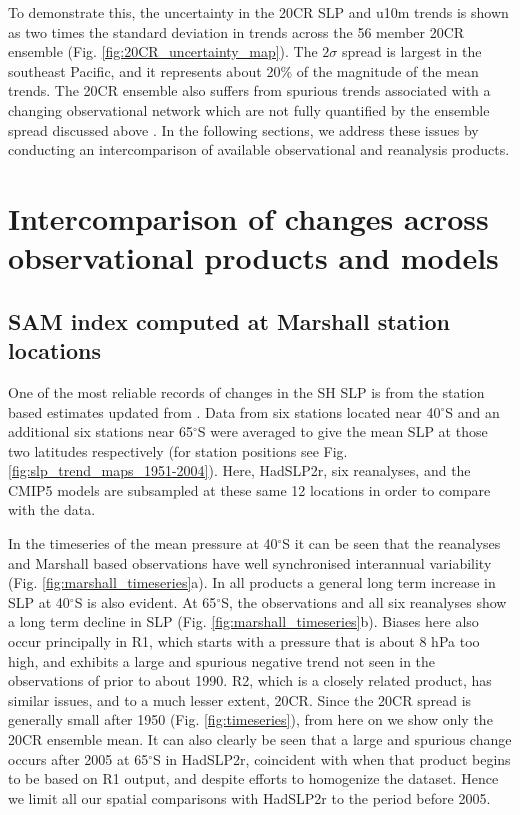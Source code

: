 \documentclass{ametsoc}
\begin{document}
To demonstrate this, the uncertainty in the 
20CR SLP and u10m trends is shown as two times the standard deviation in trends across the 56 member 
20CR ensemble (Fig. \ref{fig:20CR_uncertainty_map}). The $2 \sigma$ spread is largest in the southeast
Pacific, and it represents about 20\% of the magnitude of the mean trends. The 20CR ensemble also suffers 
from spurious trends associated with a changing observational network which are not fully quantified by 
the ensemble spread discussed above \citep{Wang_et_al_2013}. In the following sections, we address these issues 
by conducting an intercomparison of available observational and reanalysis products.

\section{Intercomparison of changes across observational products and models} \label{sec:obs-intercomp}
\subsection{SAM index computed at Marshall station locations}
One of the most reliable records of changes in the SH SLP is from the station based estimates
updated from \cite{Marshall_2003}. Data from six stations located near 40$^{\circ}$S and 
an additional six stations near 65$^{\circ}$S were averaged to give the mean SLP at those two
latitudes respectively (for station positions see Fig. \ref{fig:slp_trend_maps_1951-2004}). 
Here, HadSLP2r, six reanalyses, and the CMIP5 models are subsampled
at these same 12 locations in order to compare with the \cite{Marshall_2003} data.

In the timeseries of the mean pressure at 40$^{\circ}$S it can be seen that the reanalyses
and Marshall based observations have well synchronised interannual variability (Fig. \ref{fig:marshall_timeseries}a).
In all products a general long term increase in SLP at 40$^{\circ}$S is also evident. At 65$^{\circ}$S, 
the observations and all six reanalyses show a long term decline in 
SLP (Fig. \ref{fig:marshall_timeseries}b). Biases here also occur principally in R1, which starts 
with a pressure that is about 
8 hPa too high, and exhibits a large and spurious negative trend not seen in the
observations of \cite{Marshall_2003} prior to about 1990. R2, which 
is a closely related product, has similar issues, and to a much lesser extent, 20CR. 
Since the 20CR spread is generally small after 1950 (Fig. \ref{fig:timeseries}), 
from here on we show only the 20CR ensemble mean.
It can also clearly be seen that a large and spurious change occurs after 2005 at 65$^{\circ}$S in HadSLP2r,
coincident with when that product begins to be based on R1 output, and despite efforts to 
homogenize the dataset. Hence we limit all our spatial comparisons with HadSLP2r to the period before
2005.
\end{document}
